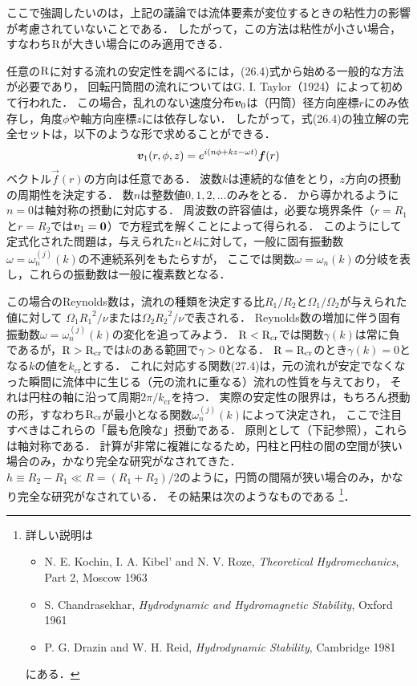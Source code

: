 ここで強調したいのは，上記の議論では流体要素が変位するときの粘性力の影響が考慮されていないことである．
したがって，この方法は粘性が小さい場合，すなわち$\mathrm{R}$が大きい場合にのみ適用できる．


任意の$\mathrm{R}$に対する流れの安定性を調べるには，(26.4)式から始める一般的な方法が必要であり，
回転円筒間の流れについてはG. I. Taylor（1924）によって初めて行われた．
この場合，乱れのない速度分布$\vb*{v}_0$は（円筒）径方向座標$r$にのみ依存し，角度$\phi$や軸方向座標$z$には依存しない．
したがって，式(26.4)の独立解の完全セットは，以下のような形で求めることができる．
\begin{equation}
    \vb*{v}_1(r,\phi,z) = e^{i(n\phi+kz-\omega t)} \vb*{f}(r)
\end{equation}
ベクトル$\vec{f}(r)$の方向は任意である．
波数$k$は連続的な値をとり，$z$方向の摂動の周期性を決定する．
数$n$は整数値$0,1,2, \ldots $のみをとる．
から導かれるように$n=0$は軸対称の摂動に対応する．
周波数の許容値は，必要な境界条件（$r=R_1$と$r=R_2$では$\vb*{v}_1=\vb*{0}$）で方程式を解くことによって得られる．
このようにして定式化された問題は，与えられた$n$と$k$に対して，一般に固有振動数$\omega=\omega_n^{(j)}(k)$の不連続系列をもたらすが，
ここでは関数$\omega=\omega_n(k)$の分岐を表し，これらの振動数は一般に複素数となる．



この場合のReynolds数は，流れの種類を決定する比$R_1/R_2$と$\Omega_1/\Omega_2$が与えられた値に対して
$\Omega_1{R_1}^2/\nu$または$\Omega_2{R_2}^2/\nu$で表される．
Reynolds数の増加に伴う固有振動数$\omega=\omega_n^{(j)}(k)$の変化を追ってみよう．
$\mathrm{R}<\mathrm{R}_{\mathrm{cr}}$では関数$\gamma(k)$は常に負であるが，$\mathrm{R}>\mathrm{R}_{\mathrm{cr}}$では$k$のある範囲で$\gamma>0$となる．
$\mathrm{R}=\mathrm{R}_{\mathrm{cr}}$のとき$\gamma(k)=0$となる$k$の値を$k_\mathrm{cr}$とする．
これに対応する関数(27.4)は，元の流れが安定でなくなった瞬間に流体中に生じる（元の流れに重なる）流れの性質を与えており，
それは円柱の軸に沿って周期$2\pi/k_\mathrm{cr}$を持つ．
実際の安定性の限界は，もちろん摂動の形，すなわち$\mathrm{R}_{\mathrm{cr}}$が最小となる関数$\omega_n^{(j)}(k)$によって決定され，
ここで注目すべきはこれらの「最も危険な」摂動である．
原則として（下記参照），これらは軸対称である．
計算が非常に複雑になるため，円柱と円柱の間の空間が狭い場合のみ，かなり完全な研究がなされてきた．
$h \equiv R_2-R_1 \ll R = (R_1+R_2)/2 $のように，円筒の間隔が狭い場合のみ，かなり完全な研究がなされている．
その結果は次のようなものである
\footnote{
詳しい説明は
\begin{itemize}
    \item N. E. Kochin, I. A. Kibel' and N. V. Roze, \textit{Theoretical Hydromechanics}, Part 2, Moscow 1963
    \item S. Chandrasekhar, \textit{Hydrodynamic and Hydromagnetic Stability}, Oxford 1961
    \item P. G. Drazin and W. H. Reid, \textit{Hydrodynamic Stability}, Cambridge 1981
\end{itemize}
にある．
}．




